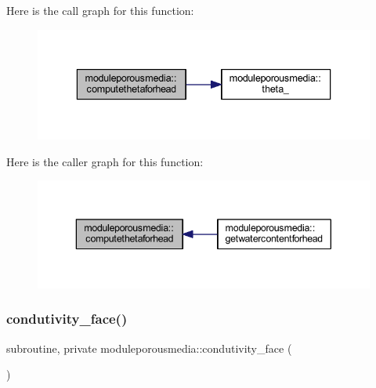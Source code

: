 Here is the call graph for this function\+:\nopagebreak
\begin{figure}[H]
\begin{center}
\leavevmode
\includegraphics[width=336pt]{namespacemoduleporousmedia_a01d07c2251d4f4c42f4f695af824a478_cgraph}
\end{center}
\end{figure}
Here is the caller graph for this function\+:\nopagebreak
\begin{figure}[H]
\begin{center}
\leavevmode
\includegraphics[width=343pt]{namespacemoduleporousmedia_a01d07c2251d4f4c42f4f695af824a478_icgraph}
\end{center}
\end{figure}
\mbox{\label{namespacemoduleporousmedia_a702433cf8268af2b48ad2dff405d1202}} 
\subsubsection{\texorpdfstring{condutivity\+\_\+face()}{condutivity\_face()}}
{\footnotesize\ttfamily subroutine, private moduleporousmedia\+::condutivity\+\_\+face (\begin{DoxyParamCaption}{ }\end{DoxyParamCaption})\hspace{0.3cm}{\ttfamily [private]}}

